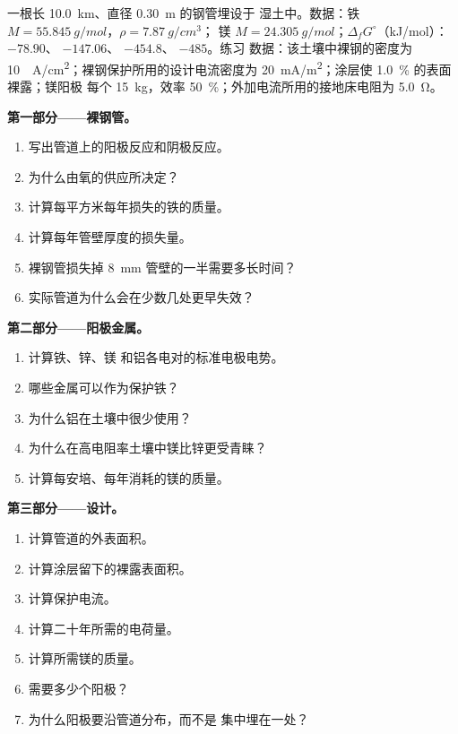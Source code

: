 \begin{problem}
\label{pb:b2:corrosion:1}
一根长 \qty{10.0}{km}、直径 \qty{0.30}{m} 的钢管埋设于
湿土中。数据：铁 $M = \qty{55.845}{g/mol}$，$\rho = \qty{7.87}{g/cm^3}$；
镁 $M = \qty{24.305}{g/mol}$；$\Delta_f G^\circ$（\unit{kJ/mol}）：
$-78.90$、 $-147.06$、 $-454.8$、 $-485$。练习
数据：该土壤中裸钢的密度为 \qty{10}{\micro
A/cm^2}；裸钢保护所用的设计电流密度为
\qty{20}{mA/m^2}；涂层使 1.0~\% 的表面裸露；镁阳极
每个 \qty{15}{kg}，效率 50~\%；外加电流所用的接地床电阻为
\qty{5.0}{\ohm}。

\medskip
\noindent\textbf{第一部分——裸钢管。}
\begin{enumerate}
  \item 写出管道上的阳极反应和阴极反应。
  \item 为什么由氧的供应所决定？
  \item 计算每平方米每年损失的铁的质量。
  \item 计算每年管壁厚度的损失量。
  \item 裸钢管损失掉 \qty{8}{mm} 管壁的一半需要多长时间？
  \item 实际管道为什么会在少数几处更早失效？
\end{enumerate}

\medskip
\noindent\textbf{第二部分——阳极金属。}
\begin{enumerate}[resume]
  \item 计算铁、锌、镁
        和铝各电对的标准电极电势。
  \item 哪些金属可以作为保护铁？
  \item 为什么铝在土壤中很少使用？
  \item 为什么在高电阻率土壤中镁比锌更受青睐？
  \item 计算每安培、每年消耗的镁的质量。
\end{enumerate}

\medskip
\noindent\textbf{第三部分——设计。}
\begin{enumerate}[resume]
  \item 计算管道的外表面积。
  \item 计算涂层留下的裸露表面积。
  \item 计算保护电流。
  \item 计算二十年所需的电荷量。
  \item 计算所需镁的质量。
  \item 需要多少个阳极？
  \item 为什么阳极要沿管道分布，而不是
        集中埋在一处？
\end{enumerate}


\end{problem}
